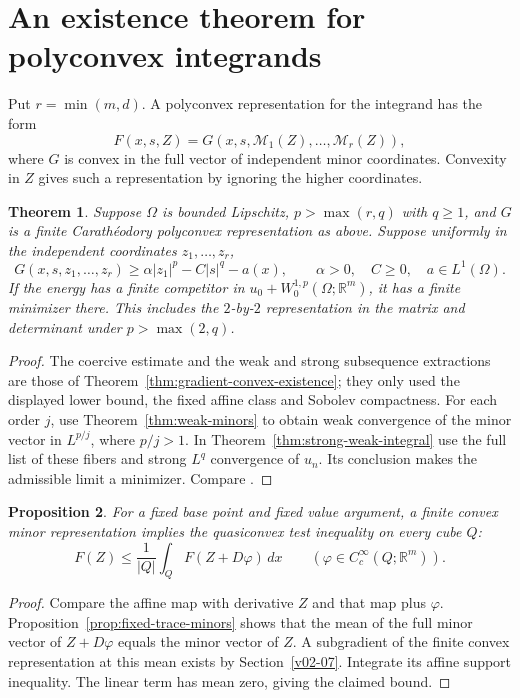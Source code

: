 \documentclass[11pt,oneside,openany]{book}
\newcommand{\R}{\mathbb R}
\theoremstyle{plain}
\newtheorem{theorem}{Theorem}[chapter]
\newtheorem{proposition}[theorem]{Proposition}
\theoremstyle{definition}
\theoremstyle{remark}
\begin{document}
\section{An existence theorem for polyconvex integrands}
\label{v08-06}

Put \(r=\min(m,d)\). A polyconvex representation for the
integrand has the form
\[
 F(x,s,Z)=G(x,s,\mathcal M_1(Z),\ldots,\mathcal M_r(Z)),
\]
where
\(G\) is convex in the full vector of independent minor
coordinates. Convexity in \(Z\) gives such a representation
by ignoring the higher coordinates.

\begin{theorem}\label{thm:polyconvex-existence}
Suppose \(\Omega\) is bounded Lipschitz,
\(p>\max(r,q)\) with \(q\ge1\), and \(G\) is a finite
Carath\'eodory polyconvex representation as above. Suppose
uniformly in the independent coordinates \(z_1,\ldots,z_r\),
\[
 G(x,s,z_1,\ldots,z_r)
       \ge \alpha|z_1|^p-C|s|^q-a(x),
 \qquad \alpha>0,\quad C\ge0,\quad a\in L^1(\Omega).
\]
If the energy has a finite competitor in
\(u_0+W^{1,p}_0(\Omega;\R^m)\), it has a finite minimizer there.
This includes the \(2\)-by-\(2\) representation in the matrix
and determinant under \(p>\max(2,q)\).
\end{theorem}

\begin{proof}
The coercive estimate and the weak and strong subsequence
extractions are those of Theorem~\ref{thm:gradient-convex-existence};
they only used the displayed lower bound, the fixed affine
class and Sobolev compactness. For each order \(j\), use
Theorem~\ref{thm:weak-minors} to obtain weak convergence of the
minor vector in \(L^{p/j}\), where \(p/j>1\). In
Theorem~\ref{thm:strong-weak-integral} use the full list of
these fibers and strong \(L^q\) convergence of \(u_n\).
Its conclusion makes the admissible limit a minimizer.
Compare \cite[Theorem 3.22 and Remark 3.23]{Dacorogna}.
\end{proof}

\begin{proposition}\label{prop:polyconvex-test}
For a fixed base point and fixed value argument, a finite
convex minor representation implies the quasiconvex
test inequality on every cube \(Q\):
\[
 F(Z)\le \frac1{|Q|}\int_Q F(Z+D\varphi)\,dx
 \qquad(\varphi\in C^\infty_c(Q;\R^m)).
\]
\end{proposition}
\begin{proof}
Compare the affine map with derivative \(Z\) and that map
plus \(\varphi\). Proposition~\ref{prop:fixed-trace-minors}
shows that the mean of the full minor vector of
\(Z+D\varphi\) equals the minor vector of \(Z\).
A subgradient of the finite convex representation at this
mean exists by Section~\ref{v02-07}. Integrate its affine
support inequality. The linear term has mean zero, giving
the claimed bound.
\end{proof}
\end{document}
